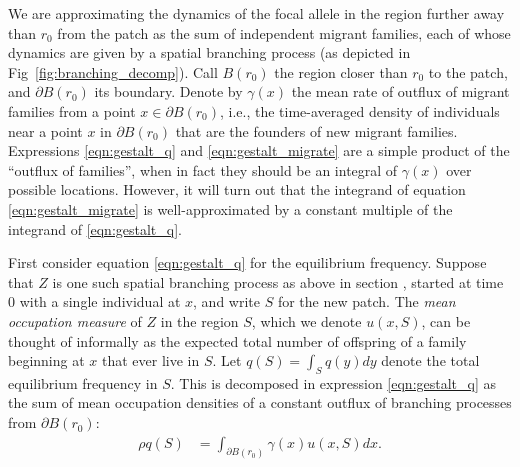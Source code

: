 \documentclass[10pt,letterpaper]{article}
\newcommand{\E}{\mathbb{E}}
\newcommand{\secref}[1]{{\emph{\nameref{#1}}}}
\begin{document}
We are approximating the dynamics of the focal allele in the region further away than $r_0$ from the patch
as the sum of independent migrant families, each of whose dynamics are
given by a spatial branching process (as depicted in Fig~\ref{fig:branching_decomp}).
Call $B(r_0)$ the region closer than $r_0$ to the patch, and $\partial B(r_0)$ its boundary.
Denote by $\gamma(x)$ the mean rate of outflux of migrant families from a point $x \in \partial B(r_0)$,
i.e., the time-averaged density of individuals near a point $x$ in $\partial B(r_0)$ 
that are the founders of new migrant families.
Expressions \eqref{eqn:gestalt_q} and \eqref{eqn:gestalt_migrate} are a simple product of the ``outflux of families'',
when in fact they should be an integral of $\gamma(x)$ over possible locations. 
However,
it will turn out that the integrand of equation \eqref{eqn:gestalt_migrate} 
is well-approximated by a constant multiple of the integrand of \eqref{eqn:gestalt_q}.

First consider equation \eqref{eqn:gestalt_q} for the equilibrium frequency.
Suppose that $Z$ is one such spatial branching process as above in section \secref{ss:migrant_math}, 
started at time 0 with a single individual at $x$,
and write $S$ for the new patch.
The \emph{mean occupation measure} of $Z$ in the region $S$,
which we denote $u(x,S)$,
can be thought of informally 
as the expected total number of offspring of a family beginning at $x$ that ever live in $S$.
Let $q(S) = \int_S q(y) dy$ denote the total equilibrium frequency in $S$.
This is decomposed in expression \eqref{eqn:gestalt_q} 
as the sum of mean occupation densities of a constant outflux of branching processes
from $\partial B(r_0)$:
\begin{align} \label{eqn:occupation_integral}
    \rho q(S) &= \int_{\partial B(r_0)} \gamma(x) u(x,S) dx  . 
\end{align}
\end{document}

